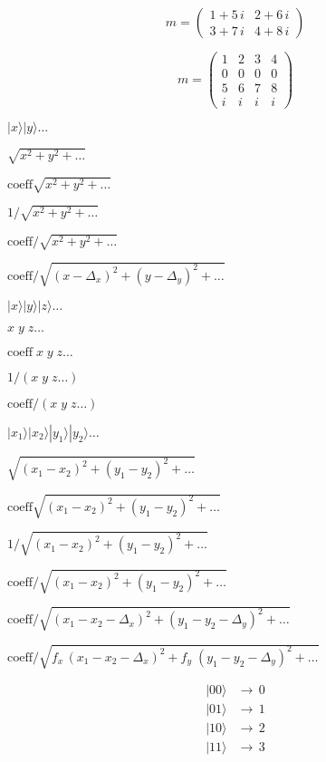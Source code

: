 \documentclass{article}
\begin{document}
\[
  m = \begin{pmatrix}
     1 + 5\,i & 2+6\,i \\
     3 + 7\,i & 4+ 8\,i
  \end{pmatrix}
\]
\pagebreak

\[
  m = \begin{pmatrix}
     1 & 2 & 3 & 4 \\
     0 & 0 & 0 & 0 \\
     5 & 6 & 7 & 8 \\
     i & i & i & i
  \end{pmatrix}
\]
\pagebreak

$|x\rangle|y\rangle\dots$
\pagebreak

$\sqrt{x^2 + y^2 + \dots}$
\pagebreak

$\text{coeff} \sqrt{x^2 + y^2 + \dots}$
\pagebreak

$1/\sqrt{x^2 + y^2 + \dots}$
\pagebreak

$\text{coeff}/\sqrt{x^2 + y^2 + \dots}$
\pagebreak

$\text{coeff}/\sqrt{(x-\Delta_x)^2 + (y-\Delta_y)^2 + \dots}$
\pagebreak

$|x\rangle|y\rangle|z\rangle\dots$
\pagebreak

$x \; y \; z \dots$
\pagebreak

$\text{coeff} \; x \; y \; z \dots$
\pagebreak

$1/(x \; y \; z \dots)$
\pagebreak

$\text{coeff}/(x \; y \; z \dots)$
\pagebreak

$|x_1\rangle|x_2\rangle|y_1\rangle|y_2\rangle\dots$
\pagebreak

$\sqrt{(x_1-x_2)^2 + (y_1-y_2)^2 + \dots}$
\pagebreak

$\text{coeff}\sqrt{(x_1-x_2)^2 + (y_1-y_2)^2 + \dots}$
\pagebreak

$1/\sqrt{(x_1-x_2)^2 + (y_1-y_2)^2 + \dots}$
\pagebreak

$\text{coeff}/\sqrt{(x_1-x_2)^2 + (y_1-y_2)^2 + \dots}$
\pagebreak

$\text{coeff}/\sqrt{(x_1-x_2-\Delta_x)^2 + (y_1-y_2-\Delta_y)^2 + \dots}$
\pagebreak

$\text{coeff}/\sqrt{f_x \, (x_1-x_2-\Delta_x)^2 + f_y \; (y_1-y_2-\Delta_y)^2 + \dots}$
\pagebreak

\[ 
\begin{aligned}
    |00\rangle & \rightarrow \, 0 \\
    |01\rangle & \rightarrow \, 1 \\
    |10\rangle & \rightarrow \, 2 \\
    |11\rangle & \rightarrow \, 3
\end{aligned}
\]
\pagebreak
\end{document}

